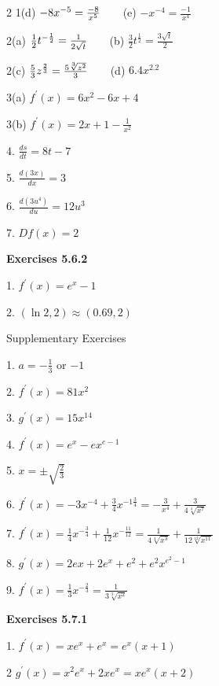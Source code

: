 \begin {multicols}{2}
1(d) $ -8 x^{ -5} =\frac{ -8}{x^{5}}\text{\quad \quad }$(e) $ -x^{ -4} =\frac{ -1}{x^{4}}$ 

2(a) $\frac{1}{2} t^{ -\frac{1}{2}} =\frac{1}{2 \sqrt{t}}\text{\quad \quad }$(b) $\frac{3}{2} t^{\frac{1}{2}} =\frac{3 \sqrt{t}}{2}$ 

2(c) $\frac{5}{3} z^{\frac{2}{3}} =\frac{5 \sqrt[{3}]{z^{2}}}{3}\text{\quad \quad }$(d) $6.4 x^{2.2}$ 

3(a) $f^{ \prime } \left (x\right ) =6 x^{2} -6 x +4$ 

3(b) $f^{ \prime } \left (x\right ) =2 x +1 -\frac{1}{x^{2}}$ 

4. $\frac{d s}{d t} =8 t -7$ 

5. $\frac{d \left (3 x\right )}{d x} =3$ 

6. $\frac{d \left (3 u^{4}\right )}{d u} =12 u^{3}$ 

7. $D f \left (x\right ) =2$ 

\textbf{Exercises 5.6.2} 

1. $f^{ \prime } \left (x\right ) =e^{x} -1$ 

2. $\left (\ln  2 ,2\right ) \approx \left (0.69 ,2\right )$ 

Supplementary Exercises 

1. $a = -\frac{1}{3}$ or $ -1$ 

2. $f^{ \prime } \left (x\right ) =81 x^{2}$ 

3. $g^{ \prime } \left (x\right ) =15 x^{14}$ 

4. $f^{ \prime } \left (x\right ) =e^{x} -e x^{e -1}$ 

5. $x = \pm \sqrt{\frac{2}{3}}$ 

6. $f^{ \prime } \left (x\right ) = -3 x^{ -4} +\frac{3}{4} x^{ -1\frac{3}{4}} = -\frac{3}{x^{4}} +\frac{3}{4 \sqrt[{4}]{x^{7}}}$ 

7. $f^{ \prime } \left (x\right ) =\frac{1}{4} x^{ -\frac{3}{4}} +\frac{1}{12} x^{ -\frac{11}{12}} =\frac{1}{4 \sqrt[{4}]{x^{3}}} +\frac{1}{12 \sqrt[{12}]{x^{11}}}$ 

8. $g^{ \prime } \left (x\right ) =2 e x +2 e^{x} +e^{2} +e^{2} x^{e^{2} -1}$ 

9. $f^{ \prime } \left (x\right ) =\frac{1}{3} x^{ -\frac{2}{3}} =\frac{1}{3 \sqrt[{3}]{x^{2}}}$ 

\textbf{Exercises 5.7.1} 

1. $f^{ \prime } \left (x\right ) =x e^{x} +e^{x} =e^{x} \left (x +1\right )$ 

2 $g^{ \prime } \left (x\right ) =x^{2} e^{x} +2 x e^{x} =x e^{x} \left (x +2\right )$ 


\end{multicols}
